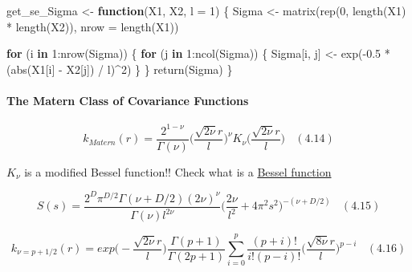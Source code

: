 \documentclass[
]{article}
\newenvironment{Shaded}{\begin{snugshade}}{\end{snugshade}}
\newcommand{\AttributeTok}[1]{\textcolor[rgb]{0.77,0.63,0.00}{#1}}
\newcommand{\ControlFlowTok}[1]{\textcolor[rgb]{0.13,0.29,0.53}{\textbf{#1}}}
\newcommand{\DecValTok}[1]{\textcolor[rgb]{0.00,0.00,0.81}{#1}}
\newcommand{\FloatTok}[1]{\textcolor[rgb]{0.00,0.00,0.81}{#1}}
\newcommand{\FunctionTok}[1]{\textcolor[rgb]{0.00,0.00,0.00}{#1}}
\newcommand{\NormalTok}[1]{#1}
\newcommand{\OtherTok}[1]{\textcolor[rgb]{0.56,0.35,0.01}{#1}}
\newcommand{\SpecialCharTok}[1]{\textcolor[rgb]{0.00,0.00,0.00}{#1}}
\begin{document}
\begin{Shaded}
\begin{Highlighting}[]
\NormalTok{get\_se\_Sigma }\OtherTok{\textless{}{-}} \ControlFlowTok{function}\NormalTok{(X1, X2, }\AttributeTok{l =} \DecValTok{1}\NormalTok{) \{}
\NormalTok{  Sigma }\OtherTok{\textless{}{-}} \FunctionTok{matrix}\NormalTok{(}\FunctionTok{rep}\NormalTok{(}\DecValTok{0}\NormalTok{, }\FunctionTok{length}\NormalTok{(X1) }\SpecialCharTok{*} \FunctionTok{length}\NormalTok{(X2)), }
                  \AttributeTok{nrow =} \FunctionTok{length}\NormalTok{(X1))}
  
  \ControlFlowTok{for}\NormalTok{ (i }\ControlFlowTok{in} \DecValTok{1}\SpecialCharTok{:}\FunctionTok{nrow}\NormalTok{(Sigma)) \{}
    \ControlFlowTok{for}\NormalTok{ (j }\ControlFlowTok{in} \DecValTok{1}\SpecialCharTok{:}\FunctionTok{ncol}\NormalTok{(Sigma)) \{}
\NormalTok{      Sigma[i, j] }\OtherTok{\textless{}{-}} \FunctionTok{exp}\NormalTok{(}\SpecialCharTok{{-}}\FloatTok{0.5} \SpecialCharTok{*}\NormalTok{ (}\FunctionTok{abs}\NormalTok{(X1[i] }\SpecialCharTok{{-}}\NormalTok{ X2[j]) }\SpecialCharTok{/}\NormalTok{ l)}\SpecialCharTok{\^{}}\DecValTok{2}\NormalTok{)}
\NormalTok{    \}}
\NormalTok{  \}}
  \FunctionTok{return}\NormalTok{(Sigma)}
\NormalTok{\}}
\end{Highlighting}
\end{Shaded}

\hypertarget{the-matern-class-of-covariance-functions}{%
\paragraph{The Matern Class of Covariance
Functions}\label{the-matern-class-of-covariance-functions}}

\[
k_{Matern}(r) = \frac {2^{1-\nu}} {\Gamma(\nu)} 
\Big( \frac {\sqrt{2\nu }r} l \Big)^ \nu
K_\nu \Big(\frac {\sqrt{2\nu }r} {l}\Big)
\ \ \ \ (4.14)
\]

\(K_{\nu}\) is a modified Bessel function!! Check what is a
\href{https://mathworld.wolfram.com/BesselFunctionoftheFirstKind.html}{Bessel
function}

\[
S(s) = \frac {2^D \pi^{D/2} \Gamma (\nu + D/2)(2\nu)^\nu}
{\Gamma(\nu)l^{2\nu}}
\Big(\frac {2\nu} {l^2} + 4\pi^2s^2\Big)^{-(\nu + D/2)} 
\ \ \ \ (4.15)
\]

\[
k_{\nu=p+1/2}(r) = 
exp \Big(- \frac {\sqrt{2\nu} r} l\Big) 
\frac {\Gamma(p+1)} {\Gamma(2p+ 1)}
\sum^p_{i=0}
\frac {(p + i)!} {i!(p - i)!}
\Big(\frac {\sqrt {8\nu}r } l\Big) ^ {p-i}
\ \ \ \ (4.16)
\]
\end{document}
